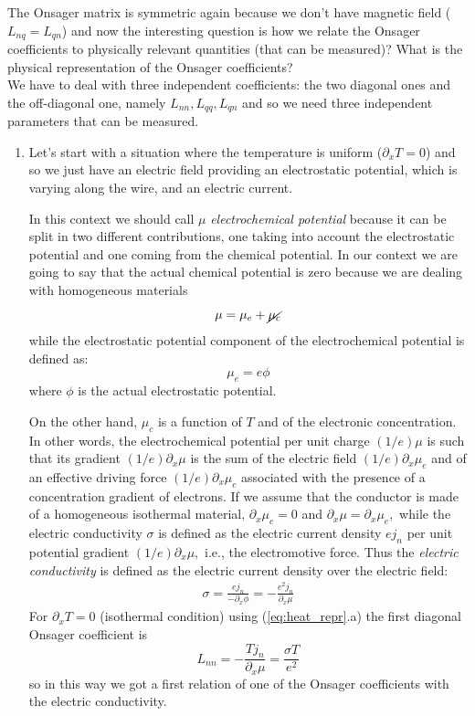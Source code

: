 \documentclass[\main/main.tex]{subfiles}
\begin{document}
The Onsager matrix is symmetric again because we don't have magnetic field ($L_{nq}=L_{qn}$) and now the interesting
question is how we relate the Onsager coefficients to physically relevant quantities (that can be measured)? What is the physical representation of the Onsager coefficients? \\

We have to deal with three independent coefficients: the two diagonal ones and the off-diagonal one, namely $L_{nn},L_{qq},L_{qn}$ and so we need three independent parameters that can be measured. 
\begin{enumerate}
    \item Let's start with a situation where the temperature is uniform ($\partial_xT=0$) and so we just have an electric field providing an electrostatic potential, which is varying along the wire, and an electric current.
    
    In this context we should call $\mu$ \textit{electrochemical potential} because it can be split in two different contributions, one taking into account the electrostatic potential and one coming from the chemical potential. In our context we are going to say that the actual chemical potential is zero because we are dealing with homogeneous materials
    \[
    \mu=\mu_e+\cancel{\mu_c}
    \]
    while the electrostatic potential component of the electrochemical potential is defined as:
    \[
    \mu_e=e\phi
    \]
    where $\phi$ is the actual electrostatic potential.
    
     On the other hand, $\mu_{c}$ is a function of $T$ and of the electronic concentration. In other words, the electrochemical potential per unit charge $(1 / e) \mu$ is such that its gradient $(1 / e) \partial_{x} \mu$ is the sum of the electric field $(1 / e) \partial_{x} \mu_{e}$ and of an effective driving force $(1 / e) \partial_{x} \mu_{c}$ associated with the presence of a concentration gradient of electrons. If we assume that the conductor is made of a homogeneous isothermal material, $\partial_{x} \mu_{c}=0$ and $\partial_{x} \mu=\partial_{x} \mu_{e},$ while the electric conductivity $\sigma$ is defined as the electric current density $e j_{n}$ per unit potential gradient $(1 / e) \partial_{x} \mu,$ i.e., the electromotive force. Thus the \textit{electric conductivity} is defined as the electric current density over the electric field:
    \begin{align}
            \sigma=\frac{e j_{n}}{-\partial_{x} \phi}=-\frac{e^{2} j_{n}}{\partial_{x} \mu}
    \end{align}
    For $\partial_{x} T=0$ (isothermal condition) using (\ref{eq:heat_repr}.a) the first diagonal Onsager coefficient is
    \begin{equation}
       \boxed{ L_{nn}=-\frac{Tj_n}{\partial_x \mu }=\frac{\sigma T}{e^2}}
       \label{eq:A}
    \end{equation}
    so in this way we got a first relation of one of the Onsager coefficients with the electric conductivity.
    

\end{enumerate}
\end{document}
